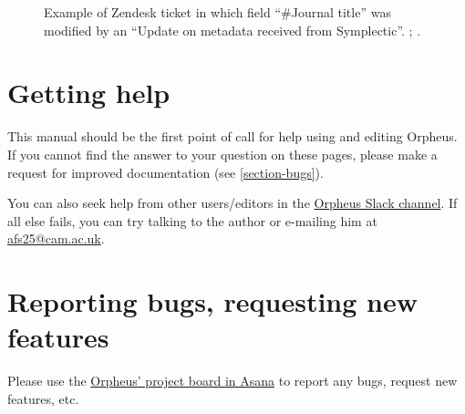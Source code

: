 \documentclass[british, 12pt]{article}
\begin{document}
\begin{figure}
  \caption{Example of Zendesk ticket in which field ``\#Journal title'' was modified by an ``Update on metadata received from Symplectic''. ; .}
  \label{fig-journal-title}
\end{figure}

\section{Getting help}

This manual should be the first point of call for help using and editing Orpheus. If you cannot find the answer to your question on these pages, please make a request for improved documentation (see \vref{section-bugs}).

You can also seek help from other users/editors in the \href{https://osc-cam.slack.com/messages/C8PJ1PDQS/}{Orpheus Slack channel}. If all else fails, you can try talking to the author or e-mailing him at \href{mailto:afs25@cam.ac.uk}{afs25@cam.ac.uk}.


\section{Reporting bugs, requesting new features}
\label{section-bugs}

Please use the \href{https://app.asana.com/0/648964409894394/board}{Orpheus' project board in Asana} to report any bugs, request new features, etc.



\printindex
\end{document}
